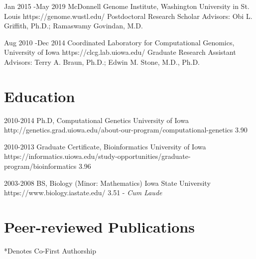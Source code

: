 \documentclass[10pt]{article} %
\begin{document}
\job
{Jan 2015 -}{May 2019}
{McDonnell Genome Institute, Washington University in St. Louis}
{https://genome.wustl.edu/}
{Postdoctoral Research Scholar}
{Advisors: Obi L. Griffith, Ph.D.; Ramaswamy Govindan, M.D.}


\job
{Aug 2010 -}{Dec 2014}
{Coordinated Laboratory for Computational Genomics, University of Iowa}
{https://clcg.lab.uiowa.edu/}
{Graduate Research Assistant}
{Advisors: Terry A. Braun, Ph.D.; Edwin M. Stone, M.D., Ph.D.}


\section{Education}

\edu
{2010-2014}
{Ph.D, Computational Genetics}
{University of Iowa}
{http://genetics.grad.uiowa.edu/about-our-program/computational-genetics}
{3.90}


\edu
{2010-2013}
{Graduate Certificate, Bioinformatics}
{University of Iowa}
{https://informatics.uiowa.edu/study-opportunities/graduate-program/bioinformatics}
{3.96}


\edu
{2003-2008}
{BS, Biology (Minor: Mathematics)}
{Iowa State University}
{https://www.biology.iastate.edu/}
{3.51  - \textit{Cum Laude}}


\section{Peer-reviewed Publications}

*Denotes Co-First Authorship

\begin{enumerate}
 


\end{enumerate}
\end{document}
